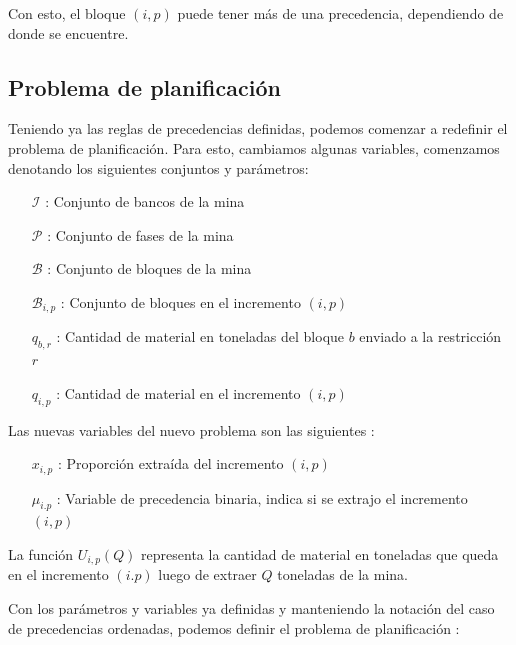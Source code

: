 \documentclass[12pt,letterpaper]{article}
\newcommand\mB{\mathcal{B}}
\newcommand\mI{\mathcal{I}}
\newcommand\mP{\mathcal{P}}
\begin{document}
Con esto, el bloque $(i,p)$ puede tener más de una precedencia, dependiendo de donde se encuentre.

\subsection{Problema de planificación}

Teniendo ya las reglas de precedencias definidas, podemos comenzar a redefinir el problema de planificación. Para esto, cambiamos algunas variables, comenzamos denotando los siguientes conjuntos y parámetros:

\begin{itemize}
    \item[$\mI$] : Conjunto de bancos de la mina
    \item[$\mP$] : Conjunto de fases de la mina
    \item[$\mB$] : Conjunto de bloques de la mina
    \item[$\mB_{i,p}$] : Conjunto de bloques en el incremento $(i,p)$
    \item[$q_{b,r}$] : Cantidad de material en toneladas del bloque $b$ enviado a la restricción $r$
    \item[$q_{i,p}$] : Cantidad de material en el incremento $(i,p)$ 
\end{itemize}

Las nuevas variables del nuevo problema son las siguientes :

\begin{itemize}
    \item[$x_{i,p}$] : Proporción extraída del incremento $(i,p)$
    \item[$\mu_{i.p}$] : Variable de precedencia binaria, indica si se extrajo el incremento $(i,p)$
\end{itemize}

La función $U_{i,p}(Q)$ representa la cantidad de material en toneladas que queda en el incremento $(i.p)$ luego de extraer $Q$ toneladas de la mina.

Con los parámetros y variables ya definidas y manteniendo la notación del caso de precedencias ordenadas, podemos definir el problema de planificación :
\\
    
\end{document}
